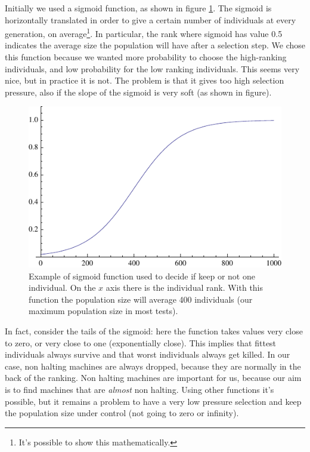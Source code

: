 \documentclass{report}
\begin{document}
Initially we used a sigmoid function, as shown in figure \ref{fig:sigmoid}. The sigmoid is horizontally translated in order to give a certain number of individuals at every generation, on average\footnote{It's possible to show this mathematically.}. In particular, the rank where sigmoid has value 0.5 indicates the average size the population will have after a selection step. We chose this function because we wanted more probability to choose the high-ranking individuals, and low probability for the low ranking individuals.
This seems very nice, but in practice it is not. The problem is that it gives too high selection pressure, also if the slope of the sigmoid is very soft (as shown in figure).

\begin{figure}[t]\centering
\includegraphics{figures/decision-function.pdf}
\caption{Example of sigmoid function used to decide if keep or not one individual. On the $x$ axis there is the individual rank. With this function the population size will average 400 individuals (our maximum population size in most tests).}
\label{fig:sigmoid}
\end{figure}

In fact, consider the tails of the sigmoid: here the function takes values very close to zero, or very close to one (exponentially close). This implies that fittest individuals always survive and that worst individuals always get killed. In our case, non halting machines are always dropped, because they are normally in the back of the ranking. Non halting machines are important for us, because our aim is to find machines that are \textit{almost} non halting.
Using other functions it's possible, but it remains a problem to have a very low pressure selection and keep the population size under control (not going to zero or infinity).
\end{document}
